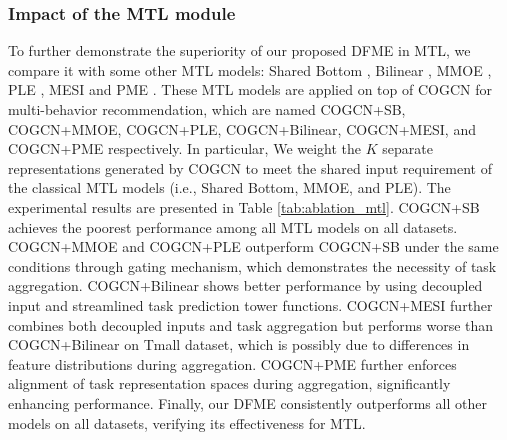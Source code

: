 \subsubsection{Impact of the MTL module}
To further demonstrate the superiority of our proposed DFME in MTL, we compare it with some other MTL models: Shared Bottom \cite{sharebottom}, Bilinear \cite{ghcf}, MMOE \cite{mmoe}, PLE \cite{PLE}, MESI \cite{cigf} and PME \cite{pkef}. These MTL models are applied on top of COGCN for multi-behavior recommendation, which are named COGCN+SB, COGCN+MMOE, COGCN+PLE, COGCN+Bilinear, COGCN+MESI, and COGCN+PME respectively. In particular, We weight the $K$ separate representations generated by COGCN to meet the shared input requirement of the classical MTL models (i.e., Shared Bottom, MMOE, and PLE). The experimental results are presented in Table \ref{tab:ablation_mtl}. COGCN+SB achieves the poorest performance among all MTL models on all datasets. COGCN+MMOE and COGCN+PLE outperform COGCN+SB under the same conditions through gating mechanism, which demonstrates the necessity of task aggregation. COGCN+Bilinear shows better performance by using decoupled input and streamlined task prediction tower functions. COGCN+MESI further combines both decoupled inputs and task aggregation but performs worse than COGCN+Bilinear on Tmall dataset, which is possibly due to differences in feature distributions during aggregation. COGCN+PME further enforces alignment of task representation spaces during aggregation, significantly enhancing performance. Finally, our DFME consistently outperforms all other models on all datasets, verifying its effectiveness for MTL.


\begin{table}[t]
    \setlength{\abovecaptionskip}{0cm}
    \setlength{\belowcaptionskip}{0mm}
    \caption{Performances of different MTL module.}
    \centering
    \begin{threeparttable}
    \end{threeparttable}
    \vspace{-4mm}
    \label{tab:ablation_mtl}
\end{table}


